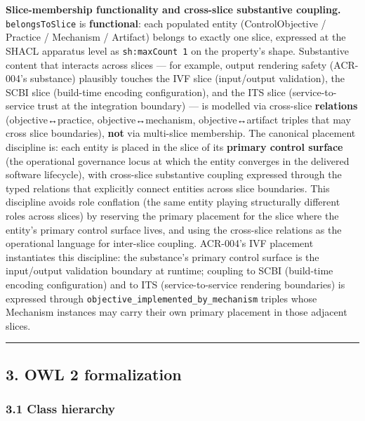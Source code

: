 \documentclass[
]{article}
\begin{document}
\textbf{Slice-membership functionality and cross-slice substantive
coupling.} \texttt{belongsToSlice} is \textbf{functional}: each
populated entity (ControlObjective / Practice / Mechanism / Artifact)
belongs to exactly one slice, expressed at the SHACL apparatus level as
\texttt{sh:maxCount\ 1} on the property's shape. Substantive content
that interacts across slices --- for example, output rendering safety
(ACR-004's substance) plausibly touches the IVF slice (input/output
validation), the SCBI slice (build-time encoding configuration), and the
ITS slice (service-to-service trust at the integration boundary) --- is
modelled via cross-slice \textbf{relations} (objective↔practice,
objective↔mechanism, objective↔artifact triples that may cross slice
boundaries), \textbf{not} via multi-slice membership. The canonical
placement discipline is: each entity is placed in the slice of its
\textbf{primary control surface} (the operational governance locus at
which the entity converges in the delivered software lifecycle), with
cross-slice substantive coupling expressed through the typed relations
that explicitly connect entities across slice boundaries. This
discipline avoids role conflation (the same entity playing structurally
different roles across slices) by reserving the primary placement for
the slice where the entity's primary control surface lives, and using
the cross-slice relations as the operational language for inter-slice
coupling. ACR-004's IVF placement instantiates this discipline: the
substance's primary control surface is the input/output validation
boundary at runtime; coupling to SCBI (build-time encoding
configuration) and to ITS (service-to-service rendering boundaries) is
expressed through \texttt{objective\_implemented\_by\_mechanism} triples
whose Mechanism instances may carry their own primary placement in those
adjacent slices.

\begin{center}\rule{0.5\linewidth}{0.5pt}\end{center}

\subsection{3. OWL 2 formalization}\label{owl-2-formalization}

\subsubsection{3.1 Class hierarchy}\label{class-hierarchy}
\end{document}
